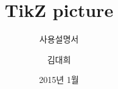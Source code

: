 \documentclass[ aspectratio=169,  12pt,blue,xcolor=pdftex,dvipsnames,table,handout,notes]{beamer}
\begin{document}
	

			\title{TikZ picture}
			\subtitle{사용설명서}
			\author{김대희}
			\date[2011.11.10]{2015년 1월}



		\begin{frame}[plain]
		\titlepage
		\end{frame}




%
%
%
\end{document}
